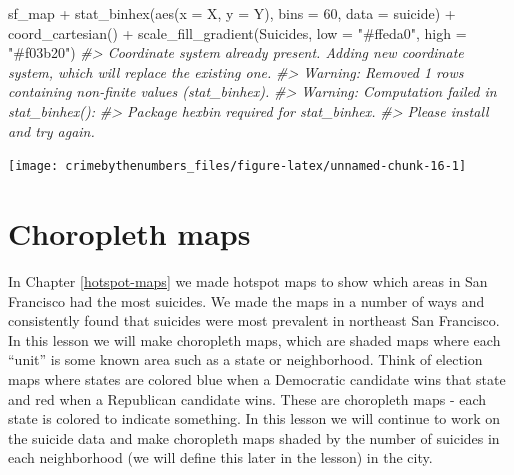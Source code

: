 \documentclass[
  12pt,
]{book}
\newenvironment{Shaded}{\begin{snugshade}}{\end{snugshade}}
\newcommand{\AttributeTok}[1]{\textcolor[rgb]{0.61,0.61,0.61}{#1}}
\newcommand{\CommentTok}[1]{\textcolor[rgb]{0.37,0.37,0.37}{\textit{#1}}}
\newcommand{\DecValTok}[1]{\textcolor[rgb]{0.06,0.06,0.06}{#1}}
\newcommand{\FunctionTok}[1]{\textcolor[rgb]{0,0,0}{#1}}
\newcommand{\NormalTok}[1]{#1}
\newcommand{\SpecialCharTok}[1]{\textcolor[rgb]{0,0,0}{#1}}
\newcommand{\StringTok}[1]{\textcolor[rgb]{0.5,0.5,0.5}{#1}}
\begin{document}
\begin{Shaded}
\begin{Highlighting}[]
\NormalTok{sf\_map }\SpecialCharTok{+}
  \FunctionTok{stat\_binhex}\NormalTok{(}\FunctionTok{aes}\NormalTok{(}\AttributeTok{x =}\NormalTok{ X, }\AttributeTok{y =}\NormalTok{ Y),}
              \AttributeTok{bins  =} \DecValTok{60}\NormalTok{,}
              \AttributeTok{data =}\NormalTok{ suicide) }\SpecialCharTok{+}
  \FunctionTok{coord\_cartesian}\NormalTok{() }\SpecialCharTok{+}
  \FunctionTok{scale\_fill\_gradient}\NormalTok{(}\StringTok{\textquotesingle{}Suicides\textquotesingle{}}\NormalTok{,}
                      \AttributeTok{low =} \StringTok{"\#ffeda0"}\NormalTok{,}
                      \AttributeTok{high =} \StringTok{"\#f03b20"}\NormalTok{)}
\CommentTok{\#\textgreater{} Coordinate system already present. Adding new coordinate system, which will replace the existing one.}
\CommentTok{\#\textgreater{} Warning: Removed 1 rows containing non{-}finite values (stat\_binhex).}
\CommentTok{\#\textgreater{} Warning: Computation failed in \textasciigrave{}stat\_binhex()\textasciigrave{}:}
\CommentTok{\#\textgreater{}   Package \textasciigrave{}hexbin\textasciigrave{} required for \textasciigrave{}stat\_binhex\textasciigrave{}.}
\CommentTok{\#\textgreater{}   Please install and try again.}
\end{Highlighting}
\end{Shaded}

\begin{center}\texttt{[image: crimebythenumbers\_files/figure-latex/unnamed-chunk-16-1]} \end{center}

\hypertarget{choropleth-maps}{%
\chapter{Choropleth maps}\label{choropleth-maps}}

In Chapter \ref{hotspot-maps} we made hotspot maps to show which areas in San Francisco had the most suicides. We made the maps in a number of ways and consistently found that suicides were most prevalent in northeast San Francisco. In this lesson we will make choropleth maps, which are shaded maps where each ``unit'' is some known area such as a state or neighborhood. Think of election maps where states are colored blue when a Democratic candidate wins that state and red when a Republican candidate wins. These are choropleth maps - each state is colored to indicate something. In this lesson we will continue to work on the suicide data and make choropleth maps shaded by the number of suicides in each neighborhood (we will define this later in the lesson) in the city.
\end{document}
